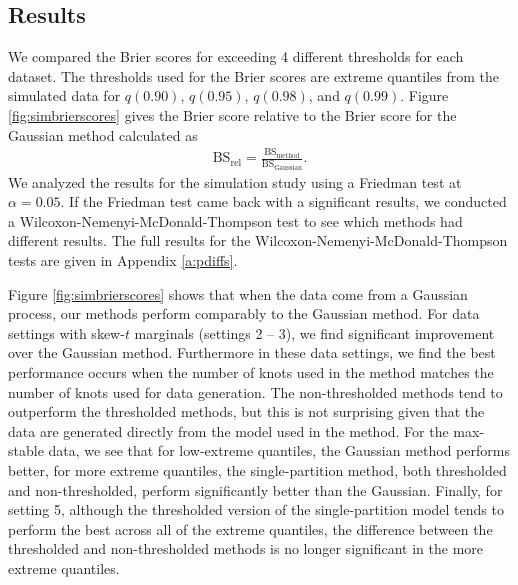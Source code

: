 \documentclass[11pt]{article}
\begin{document}
\subsection{Results}\label{s:simresults}
We compared the Brier scores for exceeding 4 different thresholds for each dataset.
The thresholds used for the Brier scores are extreme quantiles from the simulated data for $q(0.90)$, $q(0.95)$, $q(0.98)$, and $q(0.99)$.
Figure \ref{fig:simbrierscores} gives the Brier score relative to the Brier score for the Gaussian method calculated as
\begin{align}
  \text{BS}_{\text{rel}} = \frac{\text{BS}_{\text{method}}}{\text{BS}_{\text{Gaussian}}}.
\end{align}
We analyzed the results for the simulation study using a Friedman test at $\alpha = 0.05$.
If the Friedman test came back with a significant results, we conducted a Wilcoxon-Nemenyi-McDonald-Thompson test to see which methods had different results.
The full results for the Wilcoxon-Nemenyi-McDonald-Thompson tests are given in Appendix \ref{a:pdiffs}.

Figure \ref{fig:simbrierscores} shows that when the data come from a Gaussian process, our methods perform comparably to the Gaussian method.
For data settings with skew-$t$ marginals (settings 2 -- 3), we find significant improvement over the Gaussian method.
Furthermore in these data settings, we find the best performance occurs when the number of knots used in the method matches the number of knots used for data generation.
The non-thresholded methods tend to outperform the thresholded methods, but this is not surprising given that the data are generated directly from the model used in the method.
For the max-stable data, we see that for low-extreme quantiles, the Gaussian method performs better, for more extreme quantiles, the single-partition method, both thresholded and non-thresholded, perform significantly better than the Gaussian.
Finally, for setting 5, although the thresholded version of the single-partition model tends to perform the best across all of the extreme quantiles, the difference between the thresholded and non-thresholded methods is no longer significant in the more extreme quantiles.
\end{document}

